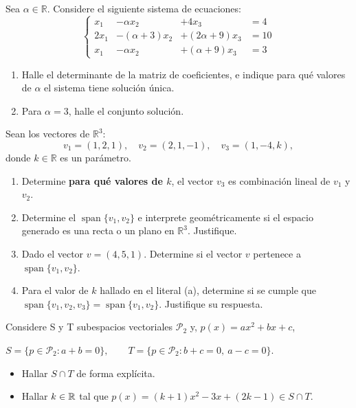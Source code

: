 \documentclass[10pt,a4]{examenEPN0}
\begin{document}
\encabezado
{}
\indicacionesPrueba
\begin{preguntas}



\item Sea $\alpha \in \mathbb{R}$. Considere el siguiente sistema de ecuaciones:
    $$
    \left\{
    \begin{alignedat}{4}
        x_1  & - \alpha x_2       & + 4x_3           &= 4 \\
        2x_1 & - (\alpha + 3)x_2  & + (2\alpha + 9)x_3 &= 10 \\
        x_1  & - \alpha x_2       & + (\alpha + 9)x_3  &= 3
    \end{alignedat}
    \right.
    $$
    \begin{enumerate}
        \item Halle el determinante de la matriz de coeficientes, e indique para qué valores de $\alpha$ el sistema tiene solución única. 
        \item Para $\alpha = 3$, halle el conjunto solución. 
    \end{enumerate}
\newpage
\item Sean los vectores de \(\mathbb{R}^3\):
\[
v_1 = (1, 2, 1), \quad v_2 = (2, 1, -1), \quad v_3 = (1, -4, k),
\]
donde \(k \in \mathbb{R}\) es un parámetro.

\begin{enumerate}
    \item Determine \textbf{para qué valores de \(k\)}, el vector \(v_3\) es combinación lineal de \(v_1\) y \(v_2\).
    \item Determine el \(\operatorname{span}\{v_1, v_2\}\) e interprete geométricamente si el espacio generado es una recta o un plano en \(\mathbb{R}^3\). Justifique.
    \item Dado el vector \(v = (4, 5, 1)\). Determine si el vector \(v\) pertenece a \(\operatorname{span}\{v_1, v_2\}\).
   \item Para el valor de \(k\) hallado en el literal (a), determine si se cumple que \(\operatorname{span}\{v_1, v_2, v_3\} = \operatorname{span}\{v_1, v_2\}\). Justifique su respuesta.
\end{enumerate}
\newpage
\item  Considere S y T subespacios vectoriales $\mathcal{P}_2$ y, $p(x)=ax^2+bx+c$, 
\begin{center}
$S=\{p \in \mathcal{P}_2 : a+b=0\},\qquad
T=\{p\in \mathcal{P}_2 : b+c=0,\ a-c=0\}.$
\end{center}
\begin{itemize}
\item[(a)] Hallar $S\cap T$ de forma explícita.
\item[(b)] Hallar $k\in\mathbb{R}$ tal que $p(x)=(k+1)x^2-3x+(2k-1)\in S\cap T$.
\end{itemize}


\end{preguntas}
\end{document}
